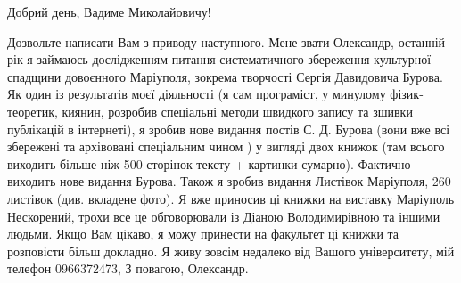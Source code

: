  
 
 
 
 

Добрий день, Вадиме Миколайовичу! 

Дозвольте написати Вам з приводу наступного. Мене звати Олександр, останній рік
я займаюсь дослідженням питання систематичного збереження культурної спадщини
довоєнного Маріуполя, зокрема творчості Сергія Давидовича Бурова. Як один із
результатів моєї діяльності (я сам програміст, у минулому фізик-теоретик,
киянин, розробив спеціальні методи швидкого запису та зшивки публікацій в
інтернеті), я зробив нове видання постів С. Д. Бурова (вони вже всі збережені
та архівовані спеціальним чином ) у вигляді двох книжок (там всього виходить
більше ніж 500 сторінок тексту + картинки сумарно). Фактично виходить нове
видання Бурова. Також я зробив видання Листівок Маріуполя, 260 листівок (див.
вкладене фото). Я вже приносив ці книжки на виставку Маріуполь Нескорений,
трохи все це обговорювали із Діаною Володимирівною та іншими людьми. Якщо Вам
цікаво, я можу принести на факультет ці книжки та розповісти більш докладно. Я
живу зовсім недалеко від Вашого університету, мій телефон 0966372473, З
повагою, Олександр.
